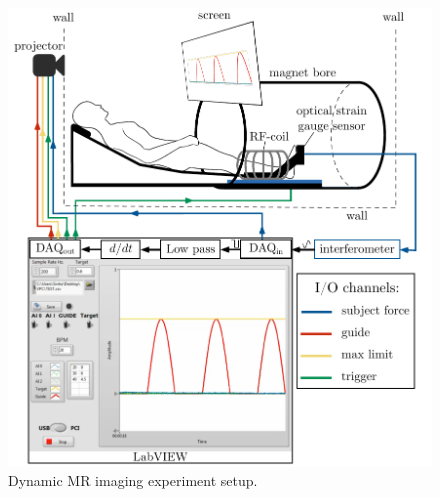 \begin{figure}[!htb]
\centering
\vspace{+0.2cm}
\centering
\includegraphics[width=\textwidth]{Figures/Setup.pdf}
\caption[Dynamic MR imaging experiment setup]{Dynamic MR imaging experiment setup.}
\label{fig: VEPCSetup}
\end{figure}
